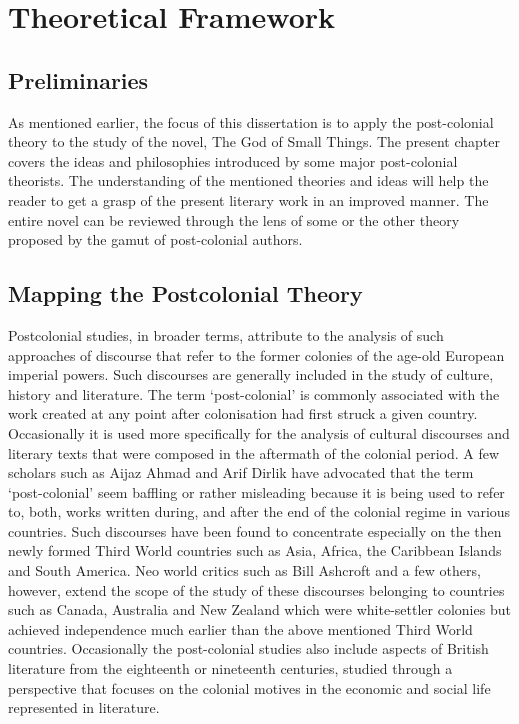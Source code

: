 \chapter{Theoretical Framework}

\section{Preliminaries}

As  mentioned  earlier,  the  focus  of  this  dissertation  is  to  apply  the  post-colonial  theory  to  the  study  of  the  novel,  The  God  of  Small  Things.  The  present  chapter  covers  the  ideas  and  philosophies  introduced  by  some  major  post-colonial  theorists.  The  understanding  of  the  mentioned  theories  and  ideas  will  help  the  reader  to  get  a  grasp  of  the  present  literary  work  in  an  improved  manner.  The  entire  novel  can  be  reviewed  through  the  lens  of  some  or  the  other  theory  proposed  by  the  gamut  of  post-colonial  authors.

\section{Mapping the Postcolonial Theory}

Postcolonial  studies,  in  broader  terms,  attribute  to  the  analysis  of  such  approaches  of  discourse  that  refer  to  the  former  colonies  of  the  age-old  European  imperial  powers.  Such  discourses  are  generally  included  in  the  study  of  culture,  history  and  literature.  The  term  ‘post-colonial’  is  commonly  associated  with  the  work  created  at  any  point  after  colonisation  had  first  struck  a  given  country.  Occasionally  it  is  used  more  specifically  for  the  analysis  of  cultural  discourses  and  literary  texts  that  were  composed  in  the  aftermath  of  the  colonial  period.    A  few  scholars  such  as  Aijaz  Ahmad  and  Arif  Dirlik  have  advocated  that  the  term  ‘post-colonial’  seem  baffling  or  rather  misleading  because  it  is  being  used  to  refer  to,  both,  works  written  during,  and  after  the  end  of  the  colonial  regime  in  various  countries.  Such  discourses  have  been  found  to  concentrate  especially  on  the  then  newly  formed  Third  World  countries  such  as  Asia,  Africa,  the  Caribbean  Islands  and  South  America.  Neo  world  critics  such  as  Bill  Ashcroft  and  a  few  others,  however,  extend  the  scope  of  the  study  of  these  discourses  belonging  to  countries  such  as  Canada,  Australia  and  New  Zealand  which  were  white-settler  colonies  but  achieved  independence  much  earlier  than  the  above  mentioned  Third  World  countries.  Occasionally  the  post-colonial  studies  also  include  aspects  of  British  literature  from  the  eighteenth  or  nineteenth  centuries,  studied  through  a  perspective  that  focuses  on  the  colonial  motives  in  the  economic  and  social  life  represented  in  literature.  

